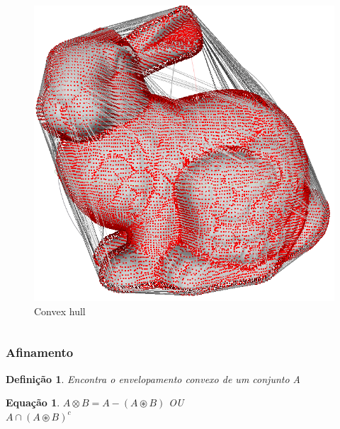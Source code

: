\documentclass[aspectratio=169]{beamer}
\theoremstyle{Definition}
\newtheorem{defn}{Defini\c c\~ao}
\newtheorem{eq}[theorem]{Equa\c c\~ao}
\begin{document}
\begin{frame}
\begin{columns}
\begin{column}{0.5\textwidth}
\begin{figure}[h]
			   	\includegraphics[height=0.15\paperheight]{imagens/convex_hull2}
				\caption{Convex hull}
			\end{figure}
		\end{column}
	\end{columns}
	
\end{frame}


\begin{frame}
	\frametitle{Afinamento}
	
	\begin{defn}
		Encontra o envelopamento convexo de um conjunto A
	\end{defn}
	
	\begin{eq}
	$ A \otimes B = A - (A \circledast B)$  OU\\
	$ A\cap (A \circledast B)^c$

	\end{eq}
	
	
\end{frame}
\end{document}
